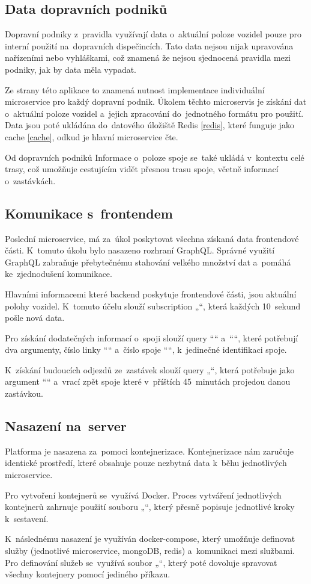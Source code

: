 \subsection {Data dopravních podniků}
Dopravní podniky z~pravidla využívají data o~aktuální poloze vozidel pouze pro interní použití na~dopravních dispečincích. Tato data nejsou nijak upravována nařízeními nebo vyhláškami, což znamená že nejsou sjednocená pravidla mezi podniky, jak by data měla vypadat.\par
Ze strany této aplikace to znamená nutnost implementace individuální microservice pro každý dopravní podnik. Úkolem těchto microservis je získání dat o~aktuální poloze vozidel a~jejich zpracování do~jednotného formátu pro použití. Data jsou poté ukládána do~datového úložiště Redis \ref{redis}, které funguje jako cache \ref{cache}, odkud je hlavní microservice čte.\par
Od dopravních podniků Informace o~poloze spoje se~také ukládá v~kontextu celé trasy, což umožňuje cestujícím vidět přesnou trasu spoje, včetně informací o~zastávkách.
\subsection {Komunikace s~frontendem}\label{mainBackend}
Poslední microservice, má za~úkol poskytovat všechna získaná data frontendové části. K~tomuto úkolu bylo nasazeno rozhraní GraphQL. Správné využití GraphQL zabraňuje přebytečnému stahování velkého množství dat a~pomáhá ke~zjednodušení komunikace. \cite{} \par
Hlavními informacemi které backend poskytuje frontendové části, jsou aktuální polohy vozidel. K~tomuto účelu slouží subscription „“, která každých 10~sekund pošle nová data.\par
Pro získání dodatečných informací o~spoji slouží query ““ \newline a~““, které potřebují dva argumenty, číslo linky ““ \newline a~číslo spoje ““, k~jedinečné identifikaci spoje.\par
K~získání budoucích odjezdů ze~zastávek slouží query „“, která potřebuje jako argument ““ a~vrací zpět spoje které v~příštích 45~minutách projedou danou zastávkou.
\newpage
\subsection{Nasazení na~server}
Platforma je nasazena za~pomoci kontejnerizace. Kontejnerizace nám zaručuje identické prostředí, které obsahuje pouze nezbytná data k~běhu jednotlivých microservice.\par
Pro vytvoření kontejnerů se~využívá Docker. Proces vytváření jednotlivých kontejnerů zahrnuje použití souboru „“, který přesně popisuje jednotlivé kroky k~sestavení.\par
K~následnému nasazení je využíván docker-compose, který umožňuje definovat služby (jednotlivé microservice, mongoDB, redis) a~komunikaci mezi službami. Pro definování služeb se~využívá soubor „“, který poté dovoluje spravovat všechny kontejnery pomocí jediného příkazu.
